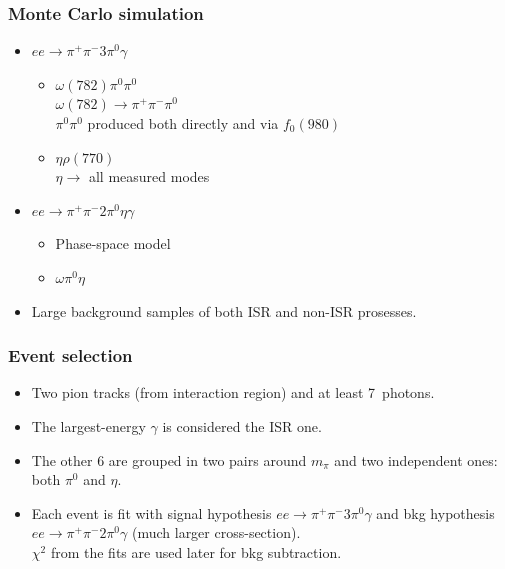 \documentclass[10pt, aspectratio=169]{beamer}
\def\pip{\pi^+}
\def\pim{\pi^-}
\def\piz{\pi^0}
\begin{document}
\begin{frame}[label=simulation]%
  \frametitle{Monte Carlo simulation}
  \Large

  \begin{itemize}
    \item $ee \to \pip\pim3\piz\gamma$
      \begin{itemize}
        \item $\omega(782)\piz\piz$
          \\ $\omega(782) \to \pip\pim\piz$
          \\ $\piz\piz$ produced both directly and via $f_0(980)$
        \item $\eta\rho(770)$
          \\ $\eta\to$ all measured modes
      \end{itemize}

    \item $ee \to \pip\pim2\piz\eta\gamma$
      \begin{itemize}
        \item Phase-space model
        \item $\omega\piz\eta$
      \end{itemize}

    \item Large background samples of both ISR and non-ISR prosesses.
  \end{itemize}
\end{frame}%

\begin{frame}[label=selection]%
  \frametitle{Event selection}
  \large

  \begin{itemize}
    \item Two pion tracks (from interaction region) and at least 
      7~photons.
    \item The largest-energy $\gamma$ is considered the ISR one.
    \item The other 6 are grouped in two pairs around $m_\pi$ and two 
      independent ones: both $\piz$ and $\eta$.
    \item Each event is fit with signal hypothesis 
      $ee\to\pip\pim3\piz\gamma$ and bkg hypothesis 
      $ee\to\pip\pim2\piz\gamma$ (much larger cross-section).
      \\ $\chi^2$ from the fits are used later for bkg subtraction.
  \end{itemize}
\end{frame}%
\end{document}
